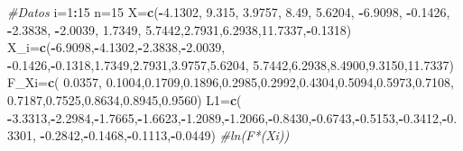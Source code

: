 \documentclass[a4paper,oneside,openany]{book}
\newenvironment{Shaded}{\begin{snugshade}}{\end{snugshade}}
\newcommand{\KeywordTok}[1]{\textcolor[rgb]{0.13,0.29,0.53}{\textbf{#1}}}
\newcommand{\DecValTok}[1]{\textcolor[rgb]{0.00,0.00,0.81}{#1}}
\newcommand{\FloatTok}[1]{\textcolor[rgb]{0.00,0.00,0.81}{#1}}
\newcommand{\CommentTok}[1]{\textcolor[rgb]{0.56,0.35,0.01}{\textit{#1}}}
\newcommand{\OperatorTok}[1]{\textcolor[rgb]{0.81,0.36,0.00}{\textbf{#1}}}
\newcommand{\NormalTok}[1]{#1}
\begin{document}
\begin{Shaded}
\begin{Highlighting}[]
\CommentTok{#Datos}
\NormalTok{i=}\DecValTok{1}\OperatorTok{:}\DecValTok{15}
\NormalTok{n=}\DecValTok{15}
\NormalTok{X=}\KeywordTok{c}\NormalTok{(}\OperatorTok{-}\FloatTok{4.1302}\NormalTok{, }\FloatTok{9.315}\NormalTok{, }\FloatTok{3.9757}\NormalTok{, }\FloatTok{8.49}\NormalTok{, }\FloatTok{5.6204}\NormalTok{, }\OperatorTok{-}\FloatTok{6.9098}\NormalTok{, }\OperatorTok{-}\FloatTok{0.1426}\NormalTok{, }\OperatorTok{-}\FloatTok{2.3838}\NormalTok{,}
                            \OperatorTok{-}\FloatTok{2.0039}\NormalTok{, }\FloatTok{1.7349}\NormalTok{, }\FloatTok{5.7442}\NormalTok{,}\FloatTok{2.7931}\NormalTok{,}\FloatTok{6.2938}\NormalTok{,}\FloatTok{11.7337}\NormalTok{,}\OperatorTok{-}\FloatTok{0.1318}\NormalTok{)}
\NormalTok{X_i=}\KeywordTok{c}\NormalTok{(}\OperatorTok{-}\FloatTok{6.9098}\NormalTok{,}\OperatorTok{-}\FloatTok{4.1302}\NormalTok{,}\OperatorTok{-}\FloatTok{2.3838}\NormalTok{,}\OperatorTok{-}\FloatTok{2.0039}\NormalTok{, }\OperatorTok{-}\FloatTok{0.1426}\NormalTok{,}\OperatorTok{-}\FloatTok{0.1318}\NormalTok{,}\FloatTok{1.7349}\NormalTok{,}\FloatTok{2.7931}\NormalTok{,}\FloatTok{3.9757}\NormalTok{,}\FloatTok{5.6204}\NormalTok{,}
      \FloatTok{5.7442}\NormalTok{,}\FloatTok{6.2938}\NormalTok{,}\FloatTok{8.4900}\NormalTok{,}\FloatTok{9.3150}\NormalTok{,}\FloatTok{11.7337}\NormalTok{)}
\NormalTok{F_Xi=}\KeywordTok{c}\NormalTok{( }\FloatTok{0.0357}\NormalTok{, }\FloatTok{0.1004}\NormalTok{,}\FloatTok{0.1709}\NormalTok{,}\FloatTok{0.1896}\NormalTok{,}\FloatTok{0.2985}\NormalTok{,}\FloatTok{0.2992}\NormalTok{,}\FloatTok{0.4304}\NormalTok{,}\FloatTok{0.5094}\NormalTok{,}\FloatTok{0.5973}\NormalTok{,}\FloatTok{0.7108}\NormalTok{,}
        \FloatTok{0.7187}\NormalTok{,}\FloatTok{0.7525}\NormalTok{,}\FloatTok{0.8634}\NormalTok{,}\FloatTok{0.8945}\NormalTok{,}\FloatTok{0.9560}\NormalTok{)}
\NormalTok{L1=}\KeywordTok{c}\NormalTok{( }\OperatorTok{-}\FloatTok{3.3313}\NormalTok{,}\OperatorTok{-}\FloatTok{2.2984}\NormalTok{,}\OperatorTok{-}\FloatTok{1.7665}\NormalTok{,}\OperatorTok{-}\FloatTok{1.6623}\NormalTok{,}\OperatorTok{-}\FloatTok{1.2089}\NormalTok{,}\OperatorTok{-}\FloatTok{1.2066}\NormalTok{,}\OperatorTok{-}\FloatTok{0.8430}\NormalTok{,}\OperatorTok{-}\FloatTok{0.6743}\NormalTok{,}\OperatorTok{-}\FloatTok{0.5153}\NormalTok{,}\OperatorTok{-}\FloatTok{0.3412}\NormalTok{,}\OperatorTok{-}\FloatTok{0.3301}\NormalTok{,}
      \OperatorTok{-}\FloatTok{0.2842}\NormalTok{,}\OperatorTok{-}\FloatTok{0.1468}\NormalTok{,}\OperatorTok{-}\FloatTok{0.1113}\NormalTok{,}\OperatorTok{-}\FloatTok{0.0449}\NormalTok{)    }\CommentTok{#ln(F*(Xi))}

\end{Highlighting}
\end{Shaded}
\end{document}
